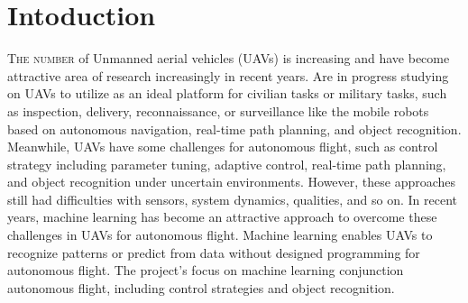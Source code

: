 \chapter{Intoduction}
\label{chap:introduction}
%
\lettrine[lines=3]{T}{he number} of Unmanned aerial vehicles (UAVs) is
increasing and have become attractive area of research increasingly in recent
years.\cite{Boucher:2015aa,daponte2017measurement} 
Are in progress studying on UAVs to utilize as an ideal platform for civilian
tasks or military tasks, such as inspection, delivery, reconnaissance, or
surveillance like the mobile robots based on autonomous navigation, real-time
path planning, and object recognition.\cite{Wang_2018, zhang2016deep}
Meanwhile, UAVs have some challenges for autonomous flight, such as control
strategy including parameter tuning, adaptive control, real-time path planning,
and object recognition under uncertain environments. 
However, these approaches still had difficulties with sensors, system dynamics,
qualities, and so on. 
In recent years, machine learning has become an attractive approach to overcome
these challenges in UAVs for autonomous flight. Machine learning enables UAVs to
recognize patterns or predict from data without designed programming for
autonomous flight.\cite{advancerobotics2019}
The project's focus on machine learning conjunction autonomous flight, including
control strategies and object recognition.
%
%
